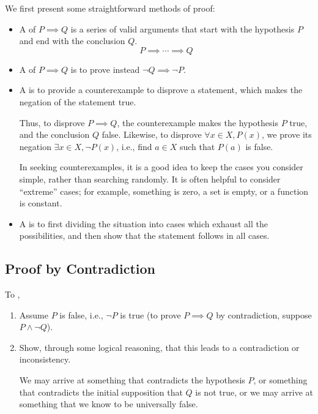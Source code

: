 We first present some straightforward methods of proof:
\begin{itemize}
\item 
A  of $P \implies Q$ is a series of valid arguments that start with the hypothesis $P$ and end with the conclusion $Q$.
\[P\implies\cdots\implies Q\]

\item A  of $P \implies Q$ is to prove instead $\lnot Q \implies \lnot P$.

\item A  is to provide a counterexample to disprove a statement, which makes the negation of the statement true.

Thus, to disprove $P\implies Q$, the counterexample makes the hypothesis $P$ true, and the conclusion $Q$ false. Likewise, to disprove $\forall x\in X, P(x)$, we prove its negation $\exists x\in X,\lnot P(x)$, i.e., find $a\in X$ such that $P(a)$ is false.

In seeking counterexamples, it is a good idea to keep the cases you consider simple, rather than searching randomly. It is often helpful to consider ``extreme'' cases; for example, something is zero, a set is empty, or a function is constant.

\item A  is to first dividing the situation into cases which exhaust all the possibilities, and then show that the statement follows in all cases.
\end{itemize}
\pagebreak

\subsection{Proof by Contradiction}
To ,
\begin{enumerate}
\item Assume $P$ is false, i.e., $\lnot P$ is true (to prove $P \implies Q$ by contradiction, suppose $P\land\lnot Q$).
\item Show, through some logical reasoning, that this leads to a contradiction or inconsistency.

We may arrive at something that contradicts the hypothesis $P$, or something that contradicts the initial supposition that $Q$ is not true, or we may arrive at something that we know to be universally false.
\end{enumerate}

